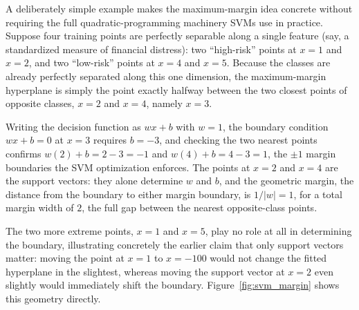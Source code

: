 \documentclass[../ai_in_finance]{subfiles}
\begin{document}
A deliberately simple example makes the maximum-margin idea concrete without requiring the full quadratic-programming machinery SVMs use in practice. Suppose four training points are perfectly separable along a single feature (say, a standardized measure of financial distress): two ``high-risk'' points at $x=1$ and $x=2$, and two ``low-risk'' points at $x=4$ and $x=5$. Because the classes are already perfectly separated along this one dimension, the maximum-margin hyperplane is simply the point exactly halfway between the two closest points of opposite classes, $x=2$ and $x=4$, namely $x=3$.

Writing the decision function as $w x + b$ with $w=1$, the boundary condition $wx+b=0$ at $x=3$ requires $b=-3$, and checking the two nearest points confirms $w(2)+b = 2-3=-1$ and $w(4)+b=4-3=1$, the $\pm 1$ margin boundaries the SVM optimization enforces. The points at $x=2$ and $x=4$ are the support vectors: they alone determine $w$ and $b$, and the geometric margin, the distance from the boundary to either margin boundary, is $1/|w|=1$, for a total margin width of $2$, the full gap between the nearest opposite-class points.

The two more extreme points, $x=1$ and $x=5$, play no role at all in determining the boundary, illustrating concretely the earlier claim that only support vectors matter: moving the point at $x=1$ to $x=-100$ would not change the fitted hyperplane in the slightest, whereas moving the support vector at $x=2$ even slightly would immediately shift the boundary. Figure~\ref{fig:svm_margin} shows this geometry directly.
\end{document}
